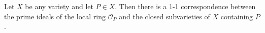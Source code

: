 Let $X$ be any variety and let $P \in X$. Then there is a 1-1 correspondence between the prime ideals of the local ring $\mathcal{O}_P$ and the closed subvarieties of $X$ containing $P$.
